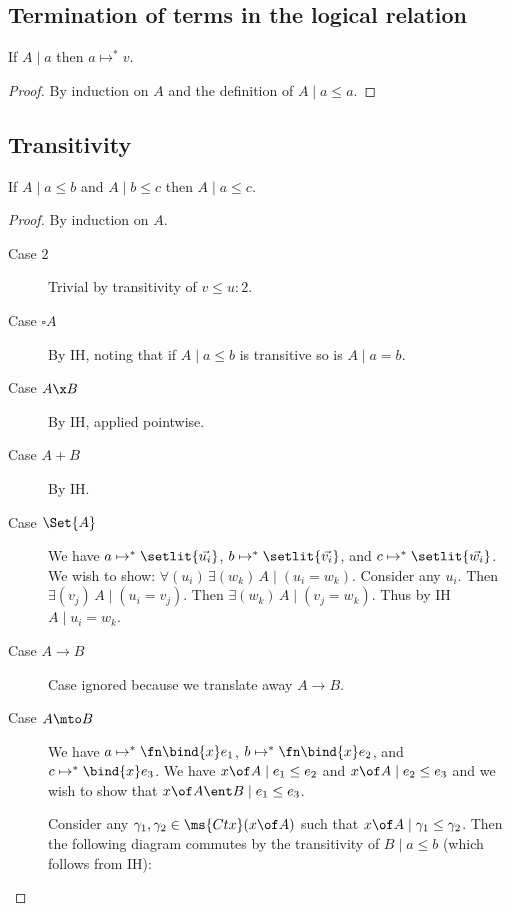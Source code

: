 \documentclass{article}
\newcommand{\step}{\mapsto}
\newcommand{\lr}[2]{#1\mathrel{|}#2}
\newcommand{\steps}{\step^*}
\newcommand{\disc}[1]{\square{#1}}
\begin{document}

\subsection{Termination of terms in the logical relation}

\begin{theorem}
  If $\lr{A}{a}$ then $a \steps v$.
\end{theorem}

\begin{proof}
  By induction on $A$ and the definition of $\lr{A}{a \le a}$.
\end{proof}


\subsection{Transitivity}
\begin{theorem}[Transitivity]
  If $\lr{A}{a \le b}$ and $\lr{A}{b \le c}$ then $\lr{A}{a \le c}$.
\end{theorem}

\begin{proof}
  By induction on $A$.
  \begin{description}
    \item[Case $2$] Trivial by transitivity of $v \le u : 2$.
    \item[Case $\disc A$] By IH, noting that if $\lr{A}{a \le b}$ is transitive
      so is $\lr{A}{a = b}$.
    \item[Case $A \x B$] By IH, applied pointwise. 
    \item[Case $A + B$] By IH. 
    \item[Case $\Set{A}$] We have $a \steps \setlit{\vec{u_i}}$, $b \steps
      \setlit{\vec{v_i}}$, and $c \steps \setlit{\vec{w_i}}$. We wish to show:
      $\forall(u_i)\, \exists(w_k)\, \lr{A}(u_i = w_k)$. Consider any $u_i$.
      Then $\exists(v_j)\, \lr{A}(u_i = v_j)$. Then $\exists(w_k)\, \lr{A}(v_j =
      w_k)$. Thus by IH $\lr{A}{u_i = w_k}$.
    \item[Case $A \to B$] Case ignored because we translate away $A \to B$.
    \item[Case $A \mto B$] We have $a \steps \fn\bind{x}e_1$, $b \steps
      \fn\bind{x}e_2$, and $c \steps\bind{x}e_3$. We have $\lr{x \of A}{e_1 \le
        e_2}$ and $\lr{x \of A}{e_2 \le e_3}$ and we wish to show that $\lr{x\of
        A \ent B}{e_1 \le e_3}$.

      Consider any $\gamma_1, \gamma_2 \in \ms{Ctx}(x \of A)$ such that $\lr{x
        \of A}{\gamma_1 \le \gamma_2}$. Then the following diagram commutes by
      the transitivity of $\lr{B}{a \le b}$ (which follows from IH):
  \end{description}
\end{proof}
\end{document}
